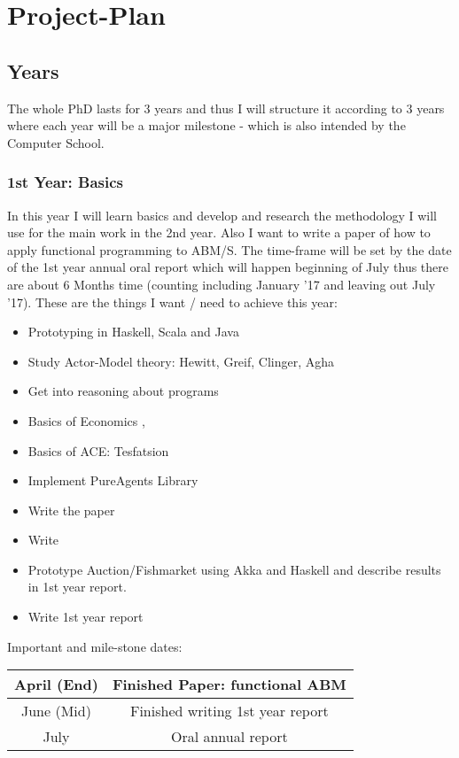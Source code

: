 \section{Project-Plan}

\subsection{Years}
The whole PhD lasts for 3 years and thus I will structure it according to 3 years where each year will be a major milestone - which is also intended by the Computer School.

\subsubsection{1st Year: Basics}
In this year I will learn basics and develop and research the methodology I will use for the main work in the 2nd year. Also I want to write a paper of how to apply functional programming to ABM/S. The time-frame will be set by the date of the 1st year annual oral report which will happen beginning of July thus there are about 6 Months time (counting including January '17 and leaving out July '17). These are the things I want / need to achieve this year:

\begin{itemize}
\item Prototyping in Haskell, Scala and Java
\item Study Actor-Model theory: Hewitt, Greif, Clinger, Agha
\item Get into reasoning about programs
\item Basics of Economics \cite{bowles_understanding_2005}, \cite{kirman_complex_2010}
\item Basics of ACE: Tesfatsion
\item Implement PureAgents Library
\item Write the paper
\item Write 
\item Prototype Auction/Fishmarket using Akka and Haskell and describe results in 1st year report.
\item Write 1st year report
\end{itemize}

Important and mile-stone dates:

\begin{center}
\begin{tabular}{ c|c } 
	April (End) & Finished Paper: functional ABM \\ 
	\hline
	June (Mid) & Finished writing 1st year report  \\ 
	\hline
	July & Oral annual report \\
\end{tabular}
\end{center}

